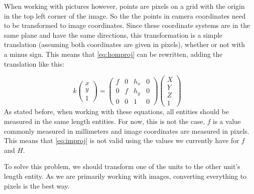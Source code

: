 When working with pictures however, points are pixels on a grid with the origin in the top left corner of the image. So the the points in camera coordinates need to be transformed to image coordinates. Since these coordinate systems are in the same plane and have the same directions, this transformation is a simple translation (assuming both coordinates are given in pixels), whether or not with a minus sign. This means that \autoref{eq:homproj} can be rewritten, adding the translation like this:

\begin{equation}\label{eq:improj}
    k
    \begin{pmatrix}
        x \\ y \\ 1
    \end{pmatrix} = 
    \begin{pmatrix}
        f & 0 & h_x & 0\\ 
        0 & f & h_y & 0\\ 
        0 & 0 & 1 & 0
    \end{pmatrix}
    \begin{pmatrix}
        X \\ Y \\ Z \\ 1
    \end{pmatrix}
\end{equation}
As stated before, when working with these equations, all entities should be measured in the same length entities. For now, this is not the case, $f$ is a value commonly measured in millimeters and image coordinates are measured in pixels. This means that \autoref{eq:improj} is not valid using the values we currently have for $f$ and $H$.\bigskip

To solve this problem, we should transform one of the units to the other unit's length entity. As we are primarily working with images, converting everything to pixels is the best way.\bigskip

